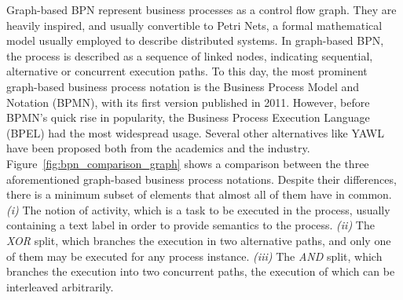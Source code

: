 Graph-based BPN represent business processes as a control flow graph. They are
heavily inspired, and usually convertible to Petri Nets\cite{lohmann2009petri},
a formal mathematical model usually employed to describe distributed systems. In
graph-based BPN, the process is described as a sequence of linked nodes,
indicating sequential, alternative or concurrent execution paths. To this day,
the most prominent graph-based business process notation is the Business Process
Model and Notation (BPMN)\cite{chinosi2012bpmn}, with its first version
published in 2011. However, before BPMN's quick rise in popularity, the Business
Process Execution Language (BPEL) had the most widespread usage. Several other
alternatives like YAWL \cite{van2005yawl} have been proposed both from the
academics and the industry. Figure~\ref{fig:bpn_comparison_graph} shows a
comparison between the three aforementioned graph-based business process
notations. Despite their differences, there is a minimum subset of elements that
almost all of them have in common. \textit{(i)} The notion of activity, which is
a task to be executed in the process, usually containing a text label in order
to provide semantics to the process. \textit{(ii)} The \emph{XOR} split, which
branches the execution in two alternative paths, and only one of them may be
executed for any process instance. \textit{(iii)} The \emph{AND} split, which
branches the execution into two concurrent paths, the execution of which can be
interleaved arbitrarily.



